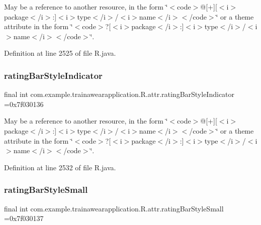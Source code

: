 May be a reference to another resource, in the form \char`\"{}$<$code$>$@\mbox{[}+\mbox{]}\mbox{[}$<$i$>$package$<$/i$>$\+:\mbox{]}$<$i$>$type$<$/i$>$/$<$i$>$name$<$/i$>$$<$/code$>$\char`\"{} or a theme attribute in the form \char`\"{}$<$code$>$?\mbox{[}$<$i$>$package$<$/i$>$\+:\mbox{]}$<$i$>$type$<$/i$>$/$<$i$>$name$<$/i$>$$<$/code$>$\char`\"{}. 

Definition at line 2525 of file R.\+java.

\mbox{\label{classcom_1_1example_1_1trainawearapplication_1_1_r_1_1attr_a99d57718cef432aaaa53833eaf2d058b}} 
\subsubsection{\texorpdfstring{ratingBarStyleIndicator}{ratingBarStyleIndicator}}
{\footnotesize\ttfamily final int com.\+example.\+trainawearapplication.\+R.\+attr.\+rating\+Bar\+Style\+Indicator =0x7f030136\hspace{0.3cm}{\ttfamily [static]}}

May be a reference to another resource, in the form \char`\"{}$<$code$>$@\mbox{[}+\mbox{]}\mbox{[}$<$i$>$package$<$/i$>$\+:\mbox{]}$<$i$>$type$<$/i$>$/$<$i$>$name$<$/i$>$$<$/code$>$\char`\"{} or a theme attribute in the form \char`\"{}$<$code$>$?\mbox{[}$<$i$>$package$<$/i$>$\+:\mbox{]}$<$i$>$type$<$/i$>$/$<$i$>$name$<$/i$>$$<$/code$>$\char`\"{}. 

Definition at line 2532 of file R.\+java.

\mbox{\label{classcom_1_1example_1_1trainawearapplication_1_1_r_1_1attr_a598a00e5f9f4ec2444c24e5072fe8bd4}} 
\subsubsection{\texorpdfstring{ratingBarStyleSmall}{ratingBarStyleSmall}}
{\footnotesize\ttfamily final int com.\+example.\+trainawearapplication.\+R.\+attr.\+rating\+Bar\+Style\+Small =0x7f030137\hspace{0.3cm}{\ttfamily [static]}}

